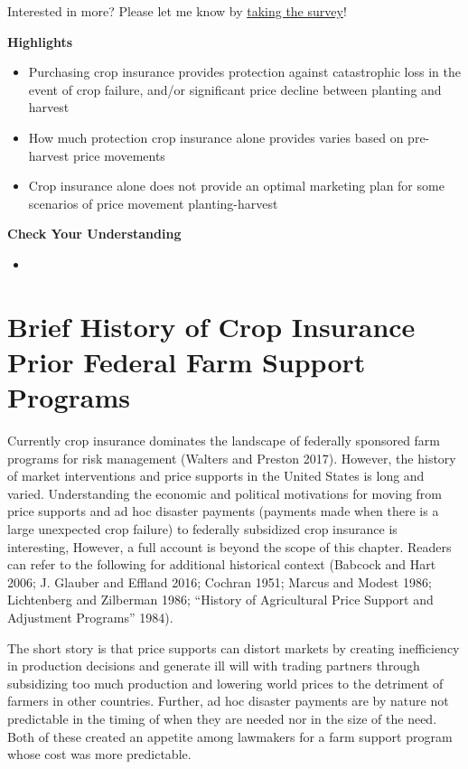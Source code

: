 \documentclass[
  letterpaper,
  DIV=11,
  numbers=noendperiod]{scrreprt}
\providecommand{\tightlist}{%
  \setlength{\itemsep}{0pt}\setlength{\parskip}{0pt}}\usepackage{longtable,booktabs,array}
\begin{document}
{Interested in more? Please let me know by}
\href{https://forms.gle/Q3VByCQZHjfQSy9D7}{taking the survey}!

\textbf{Highlights}

\begin{itemize}
\tightlist
\item
  Purchasing crop insurance provides protection against catastrophic
  loss in the event of crop failure, and/or significant price decline
  between planting and harvest
\item
  How much protection crop insurance alone provides varies based on
  pre-harvest price movements
\item
  Crop insurance alone does not provide an optimal marketing plan for
  some scenarios of price movement planting-harvest
\end{itemize}

\textbf{Check Your Understanding}

\begin{itemize}
\tightlist
\item
\end{itemize}

\section{Brief History of Crop Insurance Prior Federal Farm Support
Programs}\label{brief-history-of-crop-insurance-prior-federal-farm-support-programs}

Currently crop insurance dominates the landscape of federally sponsored
farm programs for risk management (Walters and Preston 2017). However,
the history of market interventions and price supports in the United
States is long and varied. Understanding the economic and political
motivations for moving from price supports and ad hoc disaster payments
(payments made when there is a large unexpected crop failure) to
federally subsidized crop insurance is interesting, However, a full
account is beyond the scope of this chapter. Readers can refer to the
following for additional historical context (Babcock and Hart 2006; J.
Glauber and Effland 2016; Cochran 1951; Marcus and Modest 1986;
Lichtenberg and Zilberman 1986; {``History of Agricultural Price Support
and Adjustment Programs''} 1984).

The short story is that price supports can distort markets by creating
inefficiency in production decisions and generate ill will with trading
partners through subsidizing too much production and lowering world
prices to the detriment of farmers in other countries. Further, ad hoc
disaster payments are by nature not predictable in the timing of when
they are needed nor in the size of the need. Both of these created an
appetite among lawmakers for a farm support program whose cost was more
predictable.
\end{document}
